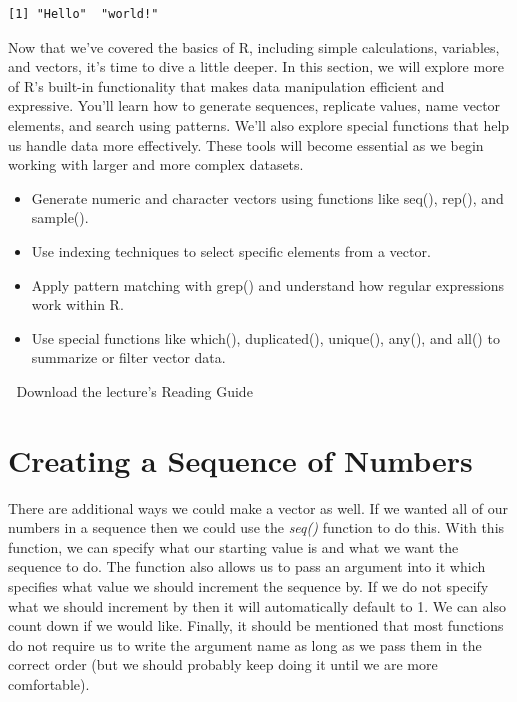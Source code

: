 \documentclass[
  letterpaper,
  DIV=11,
  numbers=noendperiod]{scrreprt}
\providecommand{\tightlist}{%
  \setlength{\itemsep}{0pt}\setlength{\parskip}{0pt}}
\begin{document}
\begin{verbatim}
[1] "Hello"  "world!"
\end{verbatim}

Now that we've covered the basics of R, including simple calculations,
variables, and vectors, it's time to dive a little deeper. In this
section, we will explore more of R's built-in functionality that makes
data manipulation efficient and expressive. You'll learn how to generate
sequences, replicate values, name vector elements, and search using
patterns. We'll also explore special functions that help us handle data
more effectively. These tools will become essential as we begin working
with larger and more complex datasets.

\begin{itemize}
\tightlist
\item
  Generate numeric and character vectors using functions like seq(),
  rep(), and sample().
\item
  Use indexing techniques to select specific elements from a vector.
\item
  Apply pattern matching with grep() and understand how regular
  expressions work within R.
\item
  Use special functions like which(), duplicated(), unique(), any(), and
  all() to summarize or filter vector data.
\end{itemize}

\begin{tcolorbox}[enhanced jigsaw, colbacktitle=quarto-callout-tip-color!10!white, breakable, bottomrule=.15mm, colframe=quarto-callout-tip-color-frame, left=2mm, opacitybacktitle=0.6, title=\textcolor{quarto-callout-tip-color}{\faLightbulb}\hspace{0.5em}{Supplemental Material}, leftrule=.75mm, opacityback=0, rightrule=.15mm, titlerule=0mm, bottomtitle=1mm, colback=white, toprule=.15mm, arc=.35mm, toptitle=1mm, coltitle=black]

📄 Download the lecture's Reading Guide

\end{tcolorbox}

\section{Creating a Sequence of
Numbers}\label{creating-a-sequence-of-numbers}

There are additional ways we could make a vector as well. If we wanted
all of our numbers in a sequence then we could use the \emph{seq()}
function to do this. With this function, we can specify what our
starting value is and what we want the sequence to do. The function also
allows us to pass an argument into it which specifies what value we
should increment the sequence by. If we do not specify what we should
increment by then it will automatically default to 1. We can also count
down if we would like. Finally, it should be mentioned that most
functions do not require us to write the argument name as long as we
pass them in the correct order (but we should probably keep doing it
until we are more comfortable).
\end{document}
